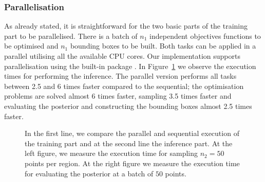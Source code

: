 \subsubsection*{Parallelisation}

As already stated, it is straightforward for the two basic parts of
the training part to be parallelised. There is a batch of \(n_1\)
independent objectives functions to be optimised and \(n_1\) bounding
boxes to be built. Both tasks can be applied in a parallel utilising
all the available CPU cores. Our implementation supports
parallelisation using the built-in  package
. In Figure~\ref{fig:exec_parallel} we observe the
execution times for performing the inference. The parallel version
performs all tasks between 2.5 and 6 times faster compared to the
sequential; the optimisation problems are solved almost 6 times
faster, sampling 3.5 times faster and evaluating the posterior and
constructing the bounding boxes almost 2.5 times faster.

\begin{figure}[ht]
  \begin{center}
    \resizebox{.47\columnwidth}{!}{%
      
    }
    \resizebox{.49\columnwidth}{!}{%
      
    }
    \end{center}
    \caption[Execution time exploiting parallelisation]{In the first
      line, we compare the parallel and sequential execution of the
      training part and at the second line the inference part. At the
      left figure, we measure the execution time for sampling \(n_2=50\)
      points per region. At the right figure we measure the execution
      time for evaluating the posterior at a batch of \(50\) points.}
      \label{fig:exec_parallel}
\end{figure}


